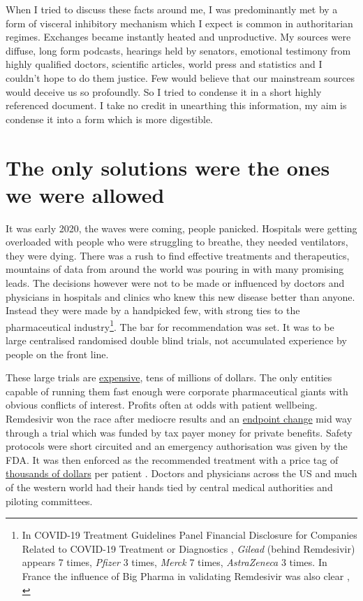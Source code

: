 \documentclass[11pt,a4paper,notitlepage]{report}
\begin{document}
When I tried to discuss these facts around me, I was predominantly met by a form of visceral inhibitory mechanism which I expect is common in authoritarian regimes. Exchanges became instantly heated and unproductive. My sources were diffuse, long form podcasts, hearings held by senators, emotional testimony from highly qualified doctors, scientific articles, world press and statistics and I couldn't hope to do them justice. Few would believe that our mainstream sources would deceive us so profoundly. So I tried to condense it in a short highly referenced document. I take no credit in unearthing this information, my aim is condense it into a form which is more digestible.

\section*{The only solutions were the ones we were allowed}

It was early 2020, the waves were coming, people panicked. Hospitals were getting overloaded with people who were struggling to breathe, they needed ventilators, they were dying. There was a rush to find effective treatments and therapeutics, mountains of data from around the world was pouring in with many promising leads. The decisions however were not to be made or influenced by doctors and physicians in hospitals and clinics who knew this new disease better than anyone. Instead they were made by a handpicked few, with strong ties to the pharmaceutical industry\footnote{In COVID-19 Treatment Guidelines Panel Financial Disclosure for Companies Related to COVID-19 Treatment or Diagnostics \cite{nihTreatmentPanelFinancialDisclosure}, \textit{Gilead} (behind Remdesivir) appears 7 times, \textit{Pfizer} 3 times, \textit{Merck} 7 times, \textit{AstraZeneca} 3 times. In France the influence of Big Pharma in validating Remdesivir was also clear \cite{doi:10.1177/1440783320936740}, \cite{mediapart31032020}}. The bar for recommendation was set. It was to be large centralised randomised double blind trials, not accumulated experience by people on the front line.

These large trials are \href{https://www.sofpromed.com/what-is-the-cost-of-a-clinical-trial}{expensive}, tens of millions of dollars. The only entities capable of running them  fast enough were corporate pharmaceutical giants with obvious conflicts of interest. Profits often at odds with patient wellbeing. Remdesivir won the race after mediocre results and an \href{https://blogs.bmj.com/bmj/2020/06/10/remdesivir-in-the-plague-year-observations-of-the-most-remarkable-occurences/}{endpoint change} mid way through a trial \cite{bmj10062020} which was funded by tax payer money for private benefits. Safety protocols were short circuited and an emergency authorisation was given by the FDA. It was then enforced as the recommended treatment with a price tag of \href{https://www.ajmc.com/view/gilead-sciences-sets-us-price-for-covid19-drug-at-2340-to-3120-based-on-insurance}{thousands of dollars} per patient \cite{ajcm20062020}. Doctors and physicians across the US and much of the western world had their hands tied by central medical authorities and piloting committees. 
\end{document}
